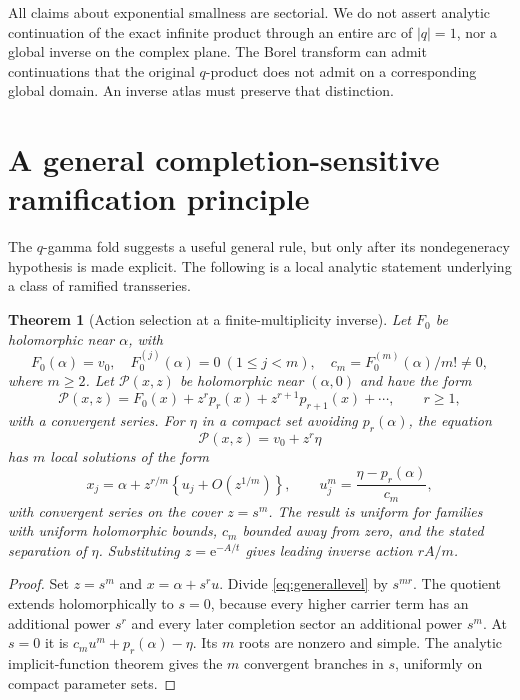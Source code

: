 \documentclass[11pt,a4paper]{article}
\numberwithin{equation}{section}
\newtheorem{theorem}{Theorem}[section]
\theoremstyle{definition}
\theoremstyle{remark}
\newcommand{\e}{\mathrm e}
\begin{document}
All claims about exponential smallness are sectorial. We do not
assert analytic continuation of the exact infinite product through
an entire arc of $|q|=1$, nor a global inverse on the complex plane.
The Borel transform can admit continuations that the original
$q$-product does not admit on a corresponding global domain. An
inverse atlas must preserve that distinction.

\section{A general completion-sensitive ramification principle}
\label{sec:ramified}

The $q$-gamma fold suggests a useful general rule, but only after its
nondegeneracy hypothesis is made explicit. The following is a local
analytic statement underlying a class of ramified transseries.

\begin{theorem}[Action selection at a finite-multiplicity inverse]
\label{thm:ramified}
Let $F_0$ be holomorphic near $\alpha$, with
\[
 F_0(\alpha)=v_0,\quad F_0^{(j)}(\alpha)=0\ (1\leq j<m),\quad
 c_m=F_0^{(m)}(\alpha)/m!\ne0,
\]
where $m\geq2$. Let $\mathcal P(x,z)$ be holomorphic near $(\alpha,0)$
and have the form
\begin{equation}
 \mathcal P(x,z)=F_0(x)+z^r p_r(x)+z^{r+1}p_{r+1}(x)+\cdots,
 \qquad r\geq1,
 \label{eq:generalperturbation}
\end{equation}
with a convergent series. For $\eta$ in a compact set avoiding
$p_r(\alpha)$, the equation
\begin{equation}
 \mathcal P(x,z)=v_0+z^r\eta
 \label{eq:generallevel}
\end{equation}
has $m$ local solutions of the form
\begin{equation}
 x_j=\alpha+z^{r/m}\left\{u_j+O(z^{1/m})\right\},\qquad
 u_j^m=\frac{\eta-p_r(\alpha)}{c_m},
 \label{eq:generalramified}
\end{equation}
with convergent series on the cover $z=s^m$. The result is uniform for
families with uniform holomorphic bounds, $c_m$ bounded away from
zero, and the stated separation of $\eta$. Substituting
$z=\e^{-A/t}$ gives leading inverse action $rA/m$.
\end{theorem}
\begin{proof}
Set $z=s^m$ and $x=\alpha+s^r u$. Divide
\eqref{eq:generallevel} by $s^{mr}$. The quotient extends holomorphically
to $s=0$, because every higher carrier term has an additional power
$s^r$ and every later completion sector an additional power $s^m$.
At $s=0$ it is $c_mu^m+p_r(\alpha)-\eta$. Its $m$ roots are nonzero
and simple. The analytic implicit-function theorem gives the $m$
convergent branches in $s$, uniformly on compact parameter sets.
\end{proof}
\end{document}
